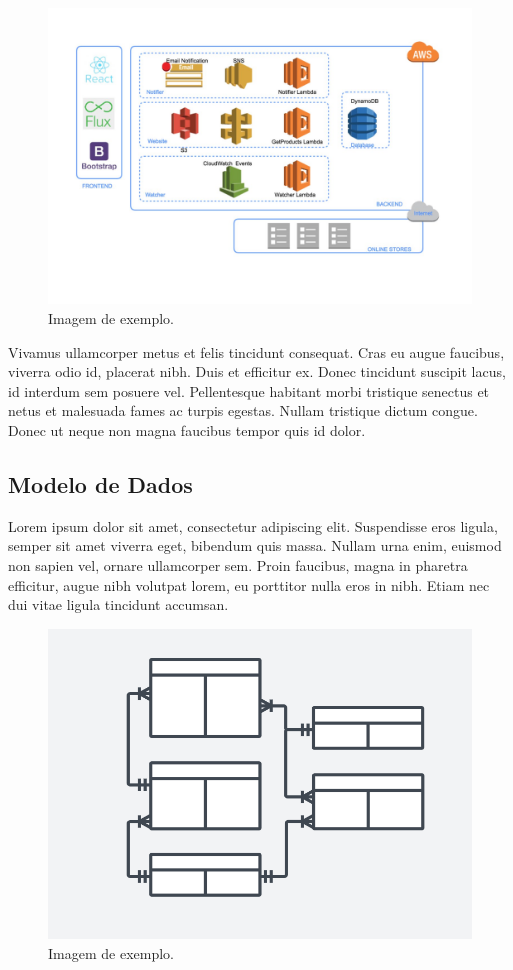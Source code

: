 \begin{figure}[!htb]
\centering
\caption{Imagem de exemplo.}
\includegraphics[width=\linewidth]{figuras/block-diagram.png}
\end{figure}
 
 Vivamus ullamcorper metus et felis tincidunt consequat. Cras eu augue faucibus, viverra odio id, placerat nibh. Duis et efficitur ex. Donec tincidunt suscipit lacus, id interdum sem posuere vel. Pellentesque habitant morbi tristique senectus et netus et malesuada fames ac turpis egestas. Nullam tristique dictum congue. Donec ut neque non magna faucibus tempor quis id dolor. 

\subsection{Modelo de Dados}
 
 Lorem ipsum dolor sit amet, consectetur adipiscing elit. Suspendisse eros ligula, semper sit amet viverra eget, bibendum quis massa. Nullam urna enim, euismod non sapien vel, ornare ullamcorper sem. Proin faucibus, magna in pharetra efficitur, augue nibh volutpat lorem, eu porttitor nulla eros in nibh. Etiam nec dui vitae ligula tincidunt accumsan.
 
\begin{figure}[!htb]
\centering
\caption{Imagem de exemplo.}
\includegraphics[width=\linewidth]{figuras/mer.png}
\end{figure}
 
